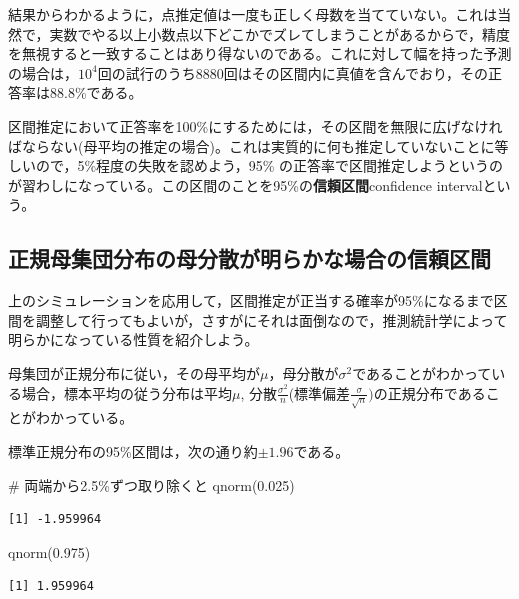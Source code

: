 \documentclass[
  a4paper,
]{ltjsbook}
\newenvironment{Shaded}{\begin{snugshade}}{\end{snugshade}}
\newcommand{\CommentTok}[1]{\textcolor[rgb]{0.37,0.37,0.37}{#1}}
\newcommand{\FloatTok}[1]{\textcolor[rgb]{0.68,0.00,0.00}{#1}}
\newcommand{\FunctionTok}[1]{\textcolor[rgb]{0.28,0.35,0.67}{#1}}
\newcommand{\NormalTok}[1]{\textcolor[rgb]{0.00,0.23,0.31}{#1}}
\begin{document}
結果からわかるように，点推定値は一度も正しく母数を当てていない。これは当然で，実数でやる以上小数点以下どこかでズレてしまうことがあるからで，精度を無視すると一致することはあり得ないのである。これに対して幅を持った予測の場合は，\ensuremath{10^{4}}回の試行のうち8880回はその区間内に真値を含んでおり，その正答率は88.8\%である。

区間推定において正答率を100\%にするためには，その区間を無限に広げなければならない(母平均の推定の場合)。これは実質的に何も推定していないことに等しいので，5\%程度の失敗を認めよう，95\%
の正答率で区間推定しようというのが習わしになっている。この区間のことを95\%の\textbf{信頼区間}confidence
intervalという。

\subsection{正規母集団分布の母分散が明らかな場合の信頼区間}\label{ux6b63ux898fux6bcdux96c6ux56e3ux5206ux5e03ux306eux6bcdux5206ux6563ux304cux660eux3089ux304bux306aux5834ux5408ux306eux4fe1ux983cux533aux9593}

上のシミュレーションを応用して，区間推定が正当する確率が95\%になるまで区間を調整して行ってもよいが，さすがにそれは面倒なので，推測統計学によって明らかになっている性質を紹介しよう。

母集団が正規分布に従い，その母平均が\(\mu\)，母分散が\(\sigma^2\)であることがわかっている場合，標本平均の従う分布は平均\(\mu\),
分散\(\frac{\sigma^2}{n}\)(標準偏差\(\frac{\sigma}{\sqrt{n}})\)の正規分布であることがわかっている。

標準正規分布の95\%区間は，次の通り約\(\pm 1.96\)である。

\begin{Shaded}
\begin{Highlighting}[]
\CommentTok{\# 両端から2.5\%ずつ取り除くと}
\FunctionTok{qnorm}\NormalTok{(}\FloatTok{0.025}\NormalTok{)}
\end{Highlighting}
\end{Shaded}

\begin{verbatim}
[1] -1.959964
\end{verbatim}

\begin{Shaded}
\begin{Highlighting}[]
\FunctionTok{qnorm}\NormalTok{(}\FloatTok{0.975}\NormalTok{)}
\end{Highlighting}
\end{Shaded}

\begin{verbatim}
[1] 1.959964
\end{verbatim}
\end{document}
